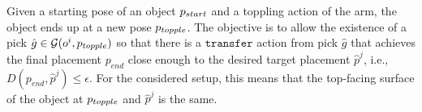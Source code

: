 
Given a starting pose of an object $p_{start}$ and a toppling action of the arm, the object ends up at a new pose $p_{topple}$. The objective is to allow the existence of a pick $\hat{g} \in \mathcal{G}( o^i, p_{topple} ) $ so that there is a $\mathtt{transfer}$ action from pick $\hat{g}$ that achieves the final  placement $p_{end}$ close enough to the desired target placement $\hat{p}^j$, i.e., $D(p_{end},\hat{p}^j) \leq \epsilon$. For the considered setup, this means that the top-facing surface of the object at $p_{topple}$ and $\hat{p}^j$ is the same.

